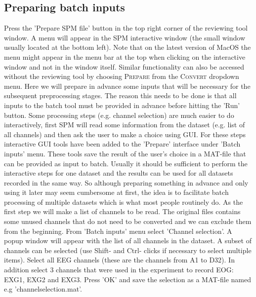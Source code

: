 \subsection{Preparing batch inputs}
Press the 'Prepare SPM file' button in the top right corner of the reviewing tool window. A menu will appear in the SPM interactive window (the small window usually located at the bottom left). Note that on the latest version of MacOS the menu might appear in the menu bar at the top when clicking on the interactive window and not in the window itself. Similar functionality can also be accessed without the reviewing tool by choosing \textsc{Prepare} from the \textsc{Convert} dropdown menu. Here we will prepare in advance some inputs that will be necessary for the subsequent preprocessing stages. The reason this needs to be done is that all inputs to the batch tool must be provided in advance before hitting the 'Run' button. Some processing steps (e.g. channel selection) are much easier to do interactively, first SPM will read some information from the dataset (e.g. list of all channels) and then ask the user to make a choice using GUI. For these steps interactive GUI tools have been added to the 'Prepare' interface under 'Batch inputs' menu. These tools save the result of the user's choice in a MAT-file that can be provided as input to batch. Usually it should be sufficient to perform the interactive steps for one dataset and the results can be used for all datasets recorded in the same way. So although preparing something in advance and only using it later may seem cumbersome at first, the idea is to facilitate batch processing of multiple datasets which is what most people routinely do.  As the first step we will make a list of channels to be read. The original files contains some unused channels that do not need to be converted and we can exclude them from the beginning. From 'Batch inputs' menu select 'Channel selection'. A popup window will appear with the list of all channels in the dataset. A subset of channels can be selected (use Shift- and Ctrl- clicks if necessary to select multiple items). Select all EEG channels (these are the channels from A1 to D32). In addition select 3 channels that were used in the experiment to record EOG: EXG1, EXG2 and EXG3. Press 'OK' and save the selection as a MAT-file named e.g 'channelselection.mat'.

